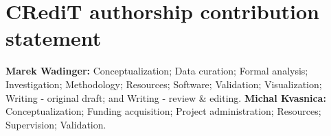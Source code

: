 \documentclass{article}
\begin{document}
\section*{CRediT authorship contribution statement}
\textbf{Marek Wadinger:} Conceptualization; Data curation; Formal analysis; Investigation; Methodology; Resources; Software; Validation; Visualization; Writing - original draft; and Writing - review \& editing. \textbf{Michal Kvasnica:} Conceptualization; Funding acquisition; Project administration; Resources; Supervision; Validation.
\end{document}
